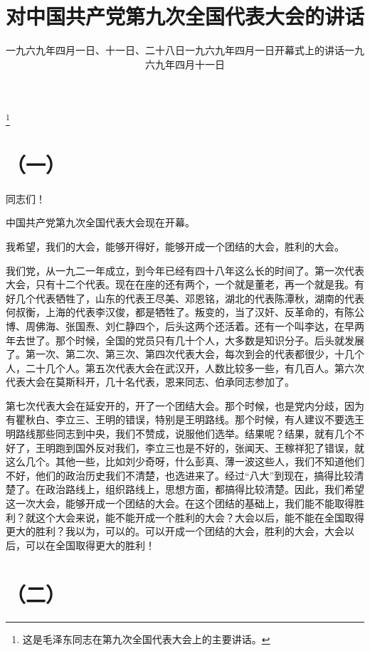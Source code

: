 
\title{对中国共产党第九次全国代表大会的讲话}
\date{一九六九年四月一日、十一日、二十八日}
\thanks{这是毛泽东同志在第九次全国代表大会上的主要讲话。}
\maketitle


\date{一九六九年四月一日开幕式上的讲话}
\section*{（一）}

同志们！

中国共产党第九次全国代表大会现在开幕。

我希望，我们的大会，能够开得好，能够开成一个团结的大会，胜利的大会。

我们党，从一九二一年成立，到今年已经有四十八年这么长的时间了。第一次代表大会，只有十二个代表。现在在座的还有两个，一个就是董老，再一个就是我。有好几个代表牺牲了，山东的代表王尽美、邓恩铭，湖北的代表陈潭秋，湖南的代表何叔衡，上海的代表李汉俊，都是牺牲了。叛变的，当了汉奸、反革命的，有陈公博、周佛海、张国焘、刘仁静四个，后头这两个还活着。还有一个叫李达，在早两年去世了。那个时候，全国的党员只有几十个人，大多数是知识分子。后头就发展了。第一次、第二次、第三次、第四次代表大会，每次到会的代表都很少，十几个人，二十几个人。第五次代表大会在武汉开，人数比较多一些，有几百人。第六次代表大会在莫斯科开，几十名代表，恩来同志、伯承同志参加了。

第七次代表大会在延安开的，开了一个团结大会。那个时候，也是党内分歧，因为有瞿秋白、李立三、王明的错误，特别是王明路线。那个时候，有人建议不要选王明路线那些同志到中央，我们不赞成，说服他们选举。结果呢？结果，就有几个不好了，王明跑到国外反对我们，李立三也是不好的，张闻天、王稼祥犯了错误，就这么几个。其他一些，比如刘少奇呀，什么彭真、薄一波这些人，我们不知道他们不好，他们的政治历史我们不清楚，也选进来了。经过“八大”到现在，搞得比较清楚了。在政治路线上，组织路线上，思想方面，都搞得比较清楚。因此，我们希望这一次大会，能够开成一个团结的大会。在这个团结的基础上，我们能不能取得胜利？就这个大会来说，能不能开成一个胜利的大会？大会以后，能不能在全国取得更大的胜利？我以为，可以的。可以开成一个团结的大会，胜利的大会，大会以后，可以在全国取得更大的胜利！

\date{一九六九年四月十一日}
\section*{（二）}

